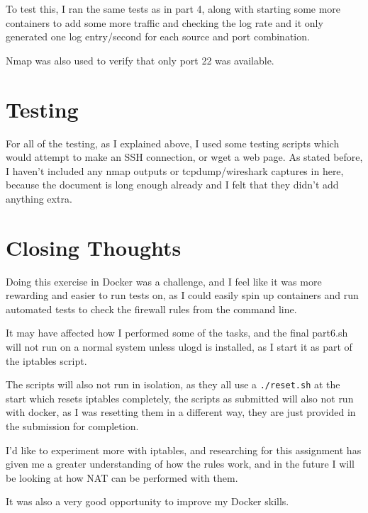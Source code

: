 \documentclass[12pt]{article}
\begin{document}
To test this, I ran the same tests as in part 4, along with starting some more containers to add some more traffic and checking the log rate and it only generated one log entry/second for each source and port combination.

Nmap was also used to verify that only port 22 was available.
\section{Testing}
For all of the testing, as I explained above, I used some testing scripts which would attempt to make an SSH connection, or wget a web page.
As stated before, I haven't included any nmap outputs or tcpdump/wireshark captures in here, because the document is long enough already and I felt that they didn't add anything extra.
\section{Closing Thoughts}
Doing this exercise in Docker was a challenge, and I feel like it was more rewarding and easier to run tests on, as I could easily spin up containers and run automated tests to check the firewall rules from the command line.

It may have affected how I performed some of the tasks, and the final part6.sh will not run on a normal system unless ulogd is installed, as I start it as part of the iptables script.

The scripts will also not run in isolation, as they all use a \texttt{./reset.sh} at the start which resets iptables completely, the scripts as submitted will also not run with docker, as I was resetting them in a different way, they are just provided in the submission for completion.

I'd like to experiment more with iptables, and researching for this assignment has given me a greater understanding of how the rules work, and in the future I will be looking at how NAT can be performed with them.

It was also a very good opportunity to improve my Docker skills.
\end{document}
